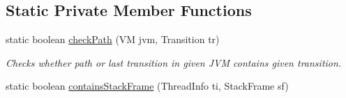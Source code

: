 \subsection*{Static Private Member Functions}
\begin{DoxyCompactItemize}
\item 
static boolean \hyperlink{classgov_1_1nasa_1_1jpf_1_1inspector_1_1server_1_1expression_1_1expressions_1_1_expression_breakpoint_single_step_a61cb5b491700728f30efa541e0af8129}{check\+Path} (VM jvm, Transition tr)
\begin{DoxyCompactList}\small\item\em Checks whether path or last transition in given J\+VM contains given transition. \end{DoxyCompactList}\item 
static boolean \hyperlink{classgov_1_1nasa_1_1jpf_1_1inspector_1_1server_1_1expression_1_1expressions_1_1_expression_breakpoint_single_step_ac0c08cf4675bb41a232734a11f79c974}{contains\+Stack\+Frame} (Thread\+Info ti, Stack\+Frame sf)
\end{DoxyCompactItemize}
